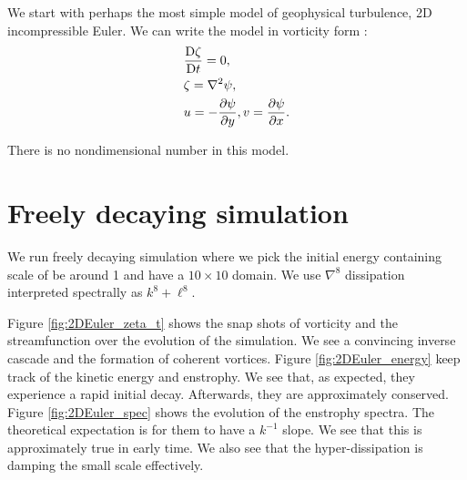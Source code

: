 \graphicspath{{2D_Euler/code/plot_snap/figs/}}

We start with perhaps the most simple model of geophysical turbulence, 2D incompressible Euler. We can write the model in vorticity form \parencite[\S 4.2.1]{Vallis_17}:
\begin{align}
    &\frac{\mathrm{D} \zeta}{\mathrm{D} t} = 0,\\
    &\zeta = \nabla^2\psi,\\
    &u = -\frac{\partial\psi}{\partial y}, v = \frac{\partial\psi}{\partial x}.
\end{align}

There is no nondimensional number in this model. 

\section{Freely decaying simulation}
We run freely decaying simulation where we pick the initial energy containing scale of be around 1 and have a $10\times 10$ domain. We use $\nabla^8$ dissipation interpreted spectrally as $k^8+\ell^8$. 

Figure \ref{fig:2DEuler_zeta_t} shows the snap shots of vorticity and the streamfunction over the evolution of the simulation. We see a convincing inverse cascade and the formation of coherent vortices. Figure \ref{fig:2DEuler_energy} keep track of the kinetic energy and enstrophy. We see that, as expected, they experience a rapid initial decay. Afterwards, they are approximately conserved. Figure \ref{fig:2DEuler_spec} shows the evolution of the enstrophy spectra. The theoretical expectation is for them to have a $k^{-1}$ slope. We see that this is approximately true in early time. We also see that the hyper-dissipation is damping the small scale effectively.

